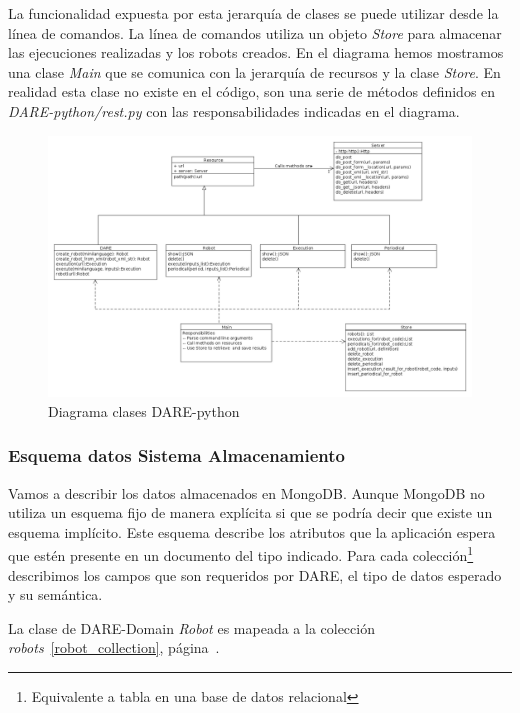 La funcionalidad expuesta por esta jerarquía de clases se puede
utilizar desde la línea de comandos. La línea de comandos utiliza un
objeto \emph{Store} para almacenar las ejecuciones realizadas y los
robots creados. En el diagrama hemos mostramos una clase \emph{Main}
que se comunica con la jerarquía de recursos y la clase
\emph{Store}. En realidad esta clase no existe en el código, son una
serie de métodos definidos en \emph{DARE-python/rest.py} con las
responsabilidades indicadas en el diagrama.

\begin{landscape}
\begin{figure}[hp]
\includegraphics[width=1.4\textwidth]{chapters/technical-manual/diagrams/clases_dare_python.png}
\caption{Diagrama clases DARE-python}\label{diagrama_clases_dare_python}
\end{figure}
\end{landscape}

\subsubsection{Esquema datos Sistema Almacenamiento}

Vamos a describir los datos almacenados en MongoDB. Aunque MongoDB no
utiliza un esquema fijo de manera explícita si que se podría decir que
existe un esquema implícito. Este esquema describe los atributos que
la aplicación espera que estén presente en un documento del tipo
indicado. Para cada colección\footnote{Equivalente a tabla en una base
de datos relacional} describimos los campos que son requeridos por
DARE, el tipo de datos esperado y su semántica.

La clase de DARE-Domain \emph{Robot} es mapeada a la colección
\emph{robots}~\ref{robot_collection},
página~\pageref{robot_collection}.

